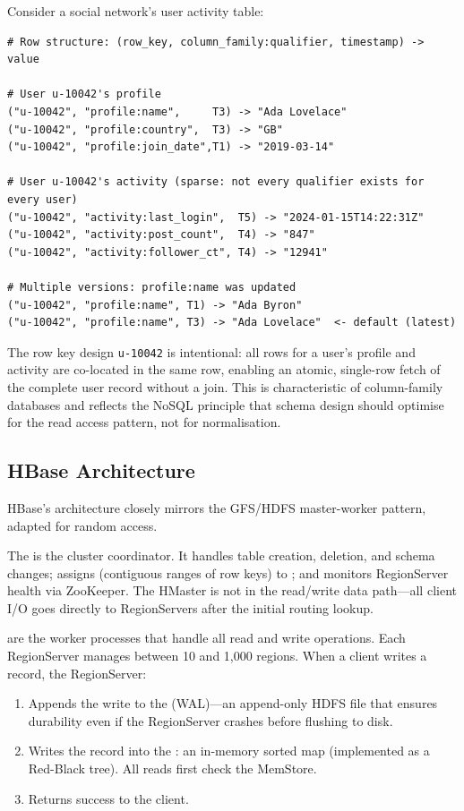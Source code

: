 Consider a social network's user activity table:

\begin{lstlisting}[style=pseudocode, caption={HBase data model: user activity table}]
# Row structure: (row_key, column_family:qualifier, timestamp) -> value

# User u-10042's profile
("u-10042", "profile:name",     T3) -> "Ada Lovelace"
("u-10042", "profile:country",  T3) -> "GB"
("u-10042", "profile:join_date",T1) -> "2019-03-14"

# User u-10042's activity (sparse: not every qualifier exists for every user)
("u-10042", "activity:last_login",  T5) -> "2024-01-15T14:22:31Z"
("u-10042", "activity:post_count",  T4) -> "847"
("u-10042", "activity:follower_ct", T4) -> "12941"

# Multiple versions: profile:name was updated
("u-10042", "profile:name", T1) -> "Ada Byron"
("u-10042", "profile:name", T3) -> "Ada Lovelace"  <- default (latest)
\end{lstlisting}

The row key design \texttt{u-10042} is intentional: all rows for a
user's profile and activity are co-located in the same row, enabling
an atomic, single-row fetch of the complete user record without a
join. This  is characteristic of
column-family databases and reflects the NoSQL principle that schema
design should optimise for the read access pattern, not for
normalisation.

\subsection{HBase Architecture}
\label{subsec:hbase-arch}

HBase's architecture closely mirrors the GFS/HDFS master-worker
pattern, adapted for random access.

The  is the cluster coordinator. It handles table
creation, deletion, and schema changes; assigns 
(contiguous ranges of row keys) to ; and
monitors RegionServer health via ZooKeeper. The HMaster is not in
the read/write data path---all client I/O goes directly to
RegionServers after the initial routing lookup.

 are the worker processes that handle all
read and write operations. Each RegionServer manages between 10 and
1,000 regions. When a client writes a record, the RegionServer:
\begin{enumerate}
  \item Appends the write to the  (WAL)---an
        append-only HDFS file that ensures durability even if the
        RegionServer crashes before flushing to disk.
  \item Writes the record into the : an in-memory
        sorted map (implemented as a Red-Black tree). All reads
        first check the MemStore.
  \item Returns success to the client.
\end{enumerate}

